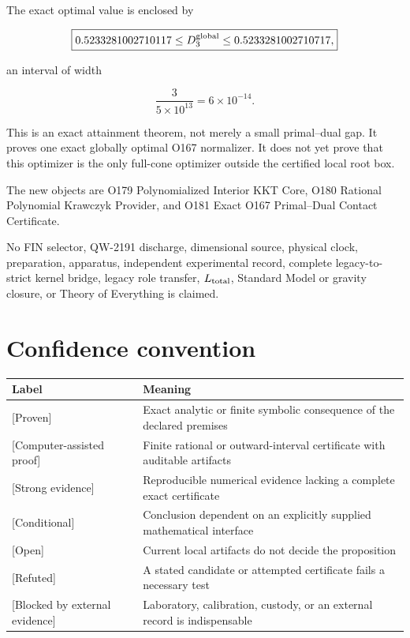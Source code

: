 \documentclass[11pt,a4paper,openany]{report}
\newcommand{\statusProven}{\textcolor{fingreen}{[Proven]}}
\newcommand{\statusStrong}{\textcolor{finblue}{[Strong evidence]}}
\newcommand{\statusRefuted}{\textcolor{finred}{[Refuted]}}
\begin{document}
The exact optimal value is enclosed by

\[
\boxed{
0.5233281002710117
\le D_3^{\rm global}\le
0.5233281002710717,}
\]

an interval of width

\[
\boxed{
\frac{3}{5\times10^{13}}=6\times10^{-14}.}
\]

This is an exact attainment theorem, not merely a small primal--dual gap. It proves one exact globally optimal O167 normalizer. It does not yet prove that this optimizer is the only full-cone optimizer outside the certified local root box.

The new objects are O179 Polynomialized Interior KKT Core, O180 Rational Polynomial Krawczyk Provider, and O181 Exact O167 Primal--Dual Contact Certificate.

No FIN selector, QW-2191 discharge, dimensional source, physical clock, preparation, apparatus, independent experimental record, complete legacy-to-strict kernel bridge, legacy role transfer, \(L_{\rm total}\), Standard Model or gravity closure, or Theory of Everything is claimed.

\chapter{Confidence convention}

\begin{center}
\begingroup\small
\setlength{\tabcolsep}{2.5pt}
\renewcommand{\arraystretch}{1.16}
\begin{longtable}{@{}p{}p{}@{}}
\toprule
\textbf{Label} & \textbf{Meaning} \\
\midrule
\endhead
\statusProven{} & Exact analytic or finite symbolic consequence of the declared premises \\
\textcolor{fingreen}{[Computer-assisted proof]} & Finite rational or outward-interval certificate with auditable artifacts \\
\statusStrong{} & Reproducible numerical evidence lacking a complete exact certificate \\
\textcolor{finviolet}{[Conditional]} & Conclusion dependent on an explicitly supplied mathematical interface \\
\textcolor{finorange}{[Open]} & Current local artifacts do not decide the proposition \\
\statusRefuted{} & A stated candidate or attempted certificate fails a necessary test \\
\textcolor{finred}{[Blocked by external evidence]} & Laboratory, calibration, custody, or an external record is indispensable \\
\bottomrule
\end{longtable}
\endgroup
\end{center}
\end{document}
